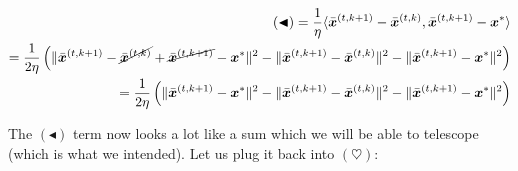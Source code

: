 \begin{align*}
    (\blacktriangleleft) = \frac{1}{\eta} \langle \bar{\bm{x}}^{(t,k+1)} - \bar{\bm{x}}^{(t,k)},\bar{\bm{x}}^{(t,k+1)} - \bm{x}^{*} \rangle \\
    = \frac{1}{2\eta} \left(\|  \bar{\bm{x}}^{(t,k+1)} - \cancel{\bar{\bm{x}}^{(t,k)}} + \cancel{\bar{\bm{x}}^{(t,k+1)}} - \bm{x}^{*} \|^2 - \|  \bar{\bm{x}}^{(t,k+1)} - \bar{\bm{x}}^{(t,k)} \|^2 - \| \bar{\bm{x}}^{(t,k+1)} - \bm{x}^{*} \|^2\right) \\
    = \frac{1}{2\eta} \left(\|  \bar{\bm{x}}^{(t,k+1)} - \bm{x}^{*} \|^2 - \|  \bar{\bm{x}}^{(t,k+1)} - \bar{\bm{x}}^{(t,k)} \|^2 - \| \bar{\bm{x}}^{(t,k+1)} - \bm{x}^{*} \|^2 \right)
\end{align*}

The $(\blacktriangleleft)$ term now looks a lot like a sum which we will be able to telescope (which is what we intended). Let us plug it back into $(\heartsuit)$:

